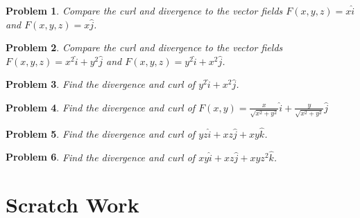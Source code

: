 \documentclass[11pt]{article}
\newtheorem{problem}{Problem}
\begin{document}
\begin{problem}
    Compare the curl and divergence to the vector fields $F(x,y,z) = x\hat{i}$ and $F(x,y,z) = x\hat{j}$.
\end{problem}

\vspace{9cm}


\begin{problem}
    Compare the curl and divergence to the vector fields $F(x,y,z) = x^2\hat{i}+y^2\hat{j}$ and $F(x,y,z) = y^2\hat{i}+x^2\hat{j}$.
\end{problem}

\vspace{9cm}


\begin{problem}
    Find the divergence and curl of $y^2 \hat{i} + x^2 \hat{j}$.
\end{problem}


\vspace{10cm}


\begin{problem}
    Find the divergence and curl of $F(x,y) = \frac{x}{\sqrt{x^2+y^2}}\hat{i}+\frac{y}{\sqrt{x^2+y^2}}\hat{j}$
\end{problem}



\vspace{10cm}



\begin{problem}
    Find the divergence and curl of $yz \hat{i} + xz \hat{j}+xy\hat{k}$.
\end{problem}

\vspace{10 cm}


\begin{problem}
    Find the divergence and curl of $xy \hat{i} + xz \hat{j}+ xyz^2 \hat{k}$.
\end{problem}





\newpage

\section{Scratch Work}
\end{document}
